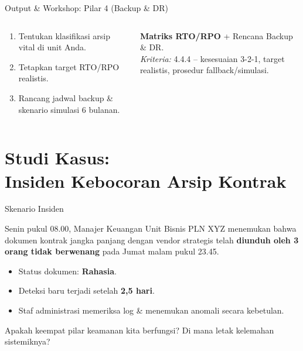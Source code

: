\documentclass[aspectratio=169,11pt]{beamer}
\begin{document}
\begin{frame}{Output \& Workshop: Pilar 4 (Backup \& DR)}
    \vspace{0.2cm}
    \begin{columns}[T]
        \begin{premiumbox}
            \scriptsize
            \begin{enumerate}
                \item Tentukan klasifikasi arsip vital di unit Anda.
                \item Tetapkan target RTO/RPO realistis.
                \item Rancang jadwal backup \& skenario simulasi 6 bulanan.
            \end{enumerate}
        \end{premiumbox}
        
        \begin{greenbox}[Portofolio 4]
            \scriptsize
            \textbf{Matriks RTO/RPO} + Rencana Backup \& DR.\\[0.1cm]
            \textit{Kriteria:} 4.4.4 -- kesesuaian 3-2-1, target realistis, prosedur fallback/simulasi.
        \end{greenbox}
    \end{columns}
\end{frame}



\section{Studi Kasus:\\Insiden Kebocoran Arsip Kontrak}

\begin{frame}{Skenario Insiden}
    \vspace{0.2cm}
    \begin{orangebox}[Kejadian]
        \small
        Senin pukul 08.00, Manajer Keuangan Unit Bisnis PLN XYZ menemukan bahwa dokumen kontrak jangka panjang dengan vendor strategis telah \textbf{diunduh oleh 3 orang tidak berwenang} pada Jumat malam pukul 23.45.
        \begin{itemize}
            \item Status dokumen: \textbf{Rahasia}.
            \item Deteksi baru terjadi setelah \textbf{2,5 hari}.
            \item Staf administrasi memeriksa log \& menemukan anomali secara kebetulan.
        \end{itemize}
    \end{orangebox}
    
    \begin{premiumbox}
        \small
        Apakah keempat pilar keamanan kita berfungsi? Di mana letak kelemahan sistemiknya?
    \end{premiumbox}
\end{frame}
\end{document}
